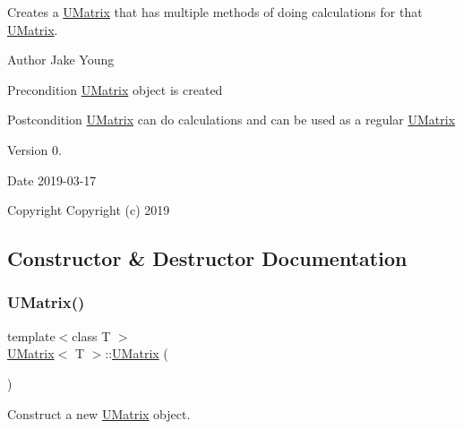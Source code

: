 Creates a \mbox{\hyperlink{class_u_matrix}{U\+Matrix}} that has multiple methods of doing calculations for that \mbox{\hyperlink{class_u_matrix}{U\+Matrix}}. 

\begin{DoxyAuthor}{Author}
Jake Young 
\end{DoxyAuthor}
\begin{DoxyPrecond}{Precondition}
\mbox{\hyperlink{class_u_matrix}{U\+Matrix}} object is created 
\end{DoxyPrecond}
\begin{DoxyPostcond}{Postcondition}
\mbox{\hyperlink{class_u_matrix}{U\+Matrix}} can do calculations and can be used as a regular \mbox{\hyperlink{class_u_matrix}{U\+Matrix}} 
\end{DoxyPostcond}
\begin{DoxyVersion}{Version}
0. 
\end{DoxyVersion}
\begin{DoxyDate}{Date}
2019-\/03-\/17
\end{DoxyDate}
\begin{DoxyCopyright}{Copyright}
Copyright (c) 2019 
\end{DoxyCopyright}


\subsection{Constructor \& Destructor Documentation}
\mbox{\label{class_u_matrix_a7c6cfdd2d26c56bca1f5b1d79e7f2ee2}} 
\subsubsection{\texorpdfstring{UMatrix()}{UMatrix()}\hspace{0.1cm}{\footnotesize\ttfamily [1/5]}}
{\footnotesize\ttfamily template$<$class T $>$ \\
\mbox{\hyperlink{class_u_matrix}{U\+Matrix}}$<$ T $>$\+::\mbox{\hyperlink{class_u_matrix}{U\+Matrix}} (\begin{DoxyParamCaption}{ }\end{DoxyParamCaption})}



Construct a new \mbox{\hyperlink{class_u_matrix}{U\+Matrix}} object. 

\mbox{\label{class_u_matrix_ad0d2d3e05ad904daed36504eddd25a2c}} 
